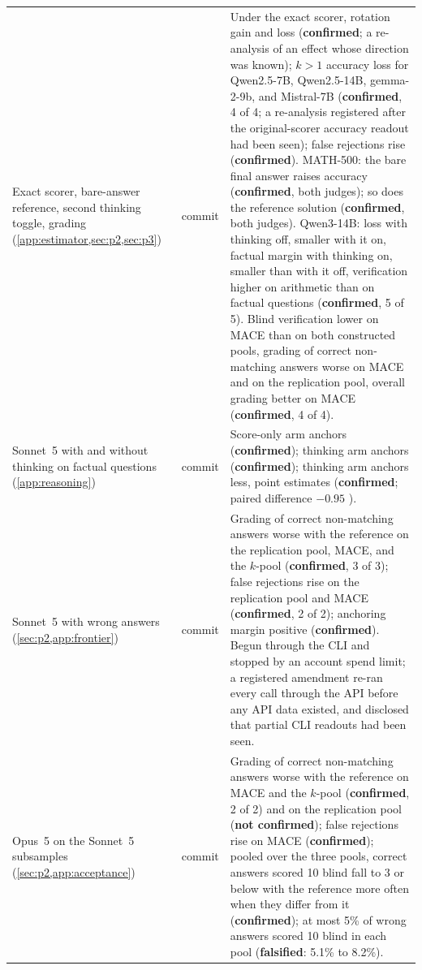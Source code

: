 {\begin{longtable}{L{3.2cm}L{1.1cm}L{8.7cm}}
Exact scorer, bare-answer reference, second thinking toggle, grading (\cref{app:estimator,sec:p2,sec:p3}) & commit & Under the exact scorer, rotation gain and loss (\textbf{confirmed}; a re-analysis of an effect whose direction was known); $k{>}1$ accuracy loss for Qwen2.5-7B, Qwen2.5-14B, gemma-2-9b, and Mistral-7B (\textbf{confirmed}, 4 of 4; a re-analysis registered after the original-scorer accuracy readout had been seen); false rejections rise (\textbf{confirmed}). MATH-500: the bare final answer raises accuracy (\textbf{confirmed}, both judges); so does the reference solution (\textbf{confirmed}, both judges). Qwen3-14B: loss with thinking off, smaller with it on, factual margin with thinking on, smaller than with it off, verification higher on arithmetic than on factual questions (\textbf{confirmed}, 5 of 5). Blind verification lower on \textsc{MACE} than on both constructed pools, grading of correct non-matching answers worse on \textsc{MACE} and on the replication pool, overall grading better on \textsc{MACE} (\textbf{confirmed}, 4 of 4). \\
Sonnet~5 with and without thinking on factual questions (\cref{app:reasoning}) & commit & Score-only arm anchors (\textbf{confirmed}); thinking arm anchors (\textbf{confirmed}); thinking arm anchors less, point estimates (\textbf{confirmed}; paired difference $-0.95$ ). \\
Sonnet~5 with wrong answers (\cref{sec:p2,app:frontier}) & commit & Grading of correct non-matching answers worse with the reference on the replication pool, \textsc{MACE}, and the $k$-pool (\textbf{confirmed}, 3 of 3); false rejections rise on the replication pool and \textsc{MACE} (\textbf{confirmed}, 2 of 2); anchoring margin positive (\textbf{confirmed}). Begun through the CLI and stopped by an account spend limit; a registered amendment re-ran every call through the API before any API data existed, and disclosed that partial CLI readouts had been seen. \\
Opus~5 on the Sonnet~5 subsamples (\cref{sec:p2,app:acceptance}) & commit & Grading of correct non-matching answers worse with the reference on \textsc{MACE} and the $k$-pool (\textbf{confirmed}, 2 of 2) and on the replication pool (\textbf{not confirmed}); false rejections rise on \textsc{MACE} (\textbf{confirmed}); pooled over the three pools, correct answers scored 10 blind fall to 3 or below with the reference more often when they differ from it (\textbf{confirmed}); at most 5\% of wrong answers scored 10 blind in each pool (\textbf{falsified}: 5.1\% to 8.2\%). \\

\end{longtable}}
